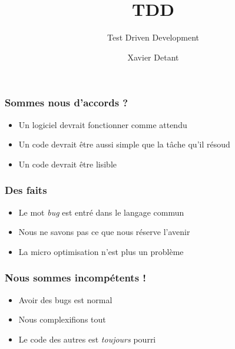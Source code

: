 \documentclass[xcolor={dvipsnames}]{beamer}
\begin{document}
\title{TDD}
\subtitle{Test Driven Development}
\author{Xavier Detant}

\begin{frame}
    \titlepage
\end{frame}

\begin{frame}
    \frametitle{Sommes nous d'accords ?}
    \begin{itemize}[<+->]
        \item Un logiciel devrait fonctionner comme attendu
        \item Un code devrait être aussi simple que la tâche qu'il résoud
        \item Un code devrait être lisible
    \end{itemize}
\end{frame}

\begin{frame}
    \frametitle{Des faits}
    \begin{itemize}[<+->]
        \item Le mot \emph{bug} est entré dans le langage commun
        \item Nous ne savons pas ce que nous réserve l'avenir
        \item La micro optimisation n'est plus un problème
    \end{itemize}
\end{frame}

\begin{frame}
    \frametitle{Nous sommes incompétents !}
    \begin{itemize}[<+->]
        \item Avoir des bugs est normal
        \item Nous complexifions tout
        \item Le code des autres est \emph{toujours} pourri
    \end{itemize}
\end{frame}
\end{document}
